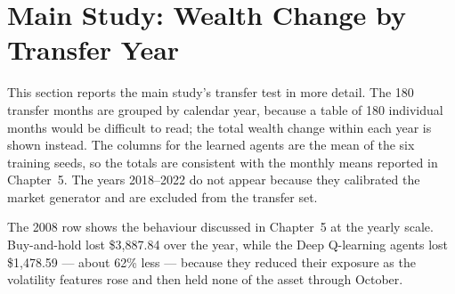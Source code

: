 \section{Main Study: Wealth Change by Transfer Year}

This section reports the main study's transfer test in more detail. The
180 transfer months are grouped by calendar year, because a table of 180
individual months would be difficult to read; the total wealth change
within each year is shown instead. The columns for the learned agents
are the mean of the six training seeds, so the totals are consistent
with the monthly means reported in Chapter~5.
The years 2018--2022 do not appear because they calibrated the market
generator and are excluded from the transfer set.

The 2008 row shows the behaviour discussed in Chapter~5 at the yearly
scale. Buy-and-hold lost \$3,887.84 over the year, while the Deep
Q-learning agents lost \$1,478.59 --- about 62\% less --- because they
reduced their exposure as the volatility features rose and then held
none of the asset through October.


